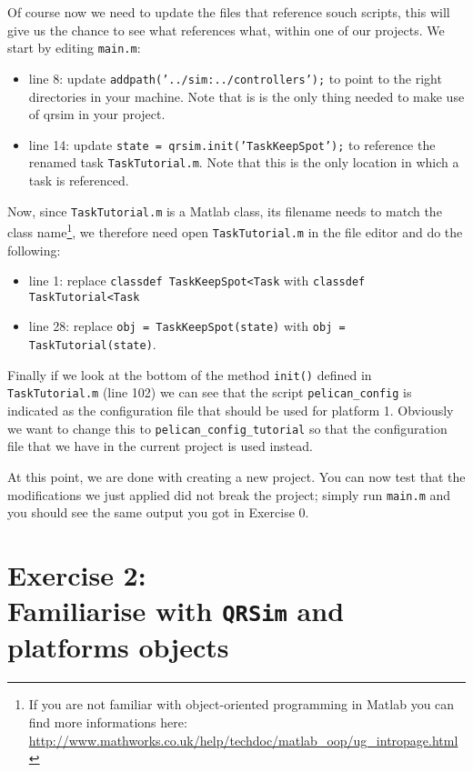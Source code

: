 \documentclass[a4paper,11pt]{article}
\begin{document}
Of course now we need to update the files that reference souch scripts, this will give us the chance to see what references what, within one of our projects.
We start by editing \texttt{main.m}:
\begin{itemize}
 \item line 8: update \texttt{addpath('../sim:../controllers');} to point to the right directories in your machine. Note that is is the only thing needed to make use of qrsim in your project.
 \item line 14: update \texttt{state = qrsim.init('TaskKeepSpot');} to reference the renamed task \texttt{TaskTutorial.m}. Note that this is the only location in which a task is referenced.
\end{itemize}  
Now, since \texttt{TaskTutorial.m} is a Matlab class, its filename needs to match the class name\footnote{If you are not familiar with object-oriented programming in Matlab you can find more informations here: \url{http://www.mathworks.co.uk/help/techdoc/matlab_oop/ug_intropage.html}}, we therefore need open \texttt{TaskTutorial.m} in the file editor and do the following:
\begin{itemize}
 \item line 1: replace \texttt{classdef TaskKeepSpot<Task} with \texttt{classdef TaskTutorial<Task}
 \item line 28: replace \texttt{obj = TaskKeepSpot(state)} with \texttt{obj = TaskTutorial(state)}.
\end{itemize}
Finally if we look at the bottom of the method \texttt{init()} defined in \texttt{TaskTutorial.m} (line 102) we can see that the script \texttt{pelican\_config} is indicated as the configuration file that should be used for platform 1. Obviously we want to change this to \texttt{pelican\_config\_tutorial} so that the configuration file that we have in the current project is used instead.

At this point, we are done with creating a new project. You can now test that the modifications we just applied did not break the project; simply run \texttt{main.m} and you should see the same output you got in Exercise 0. 


\section*{Exercise 2:\\Familiarise with \texttt{QRSim} and platforms objects}
\end{document}
